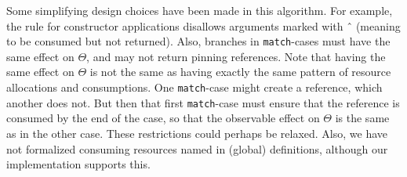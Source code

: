 \documentclass[9pt,natbib]{sigplanconf}
\begin{document}
Some simplifying design choices have been made in this algorithm.  For
example, the rule for constructor applications disallows arguments
marked with \^{\ } (meaning to be consumed but not returned).  Also,
branches in \texttt{match}-cases must have the same effect on
$\Theta$, and may not return pinning references.  Note that having the
same effect on $\Theta$ is not the same as having exactly the same
pattern of resource allocations and consumptions.  One
\texttt{match}-case might create a reference, which another does not.
But then that first \texttt{match}-case must ensure that the reference
is consumed by the end of the case, so that the observable effect on
$\Theta$ is the same as in the other case.  These restrictions could
perhaps be relaxed.  Also, we have not formalized consuming resources
named in (global) definitions, although our implementation supports
this.
\end{document}

